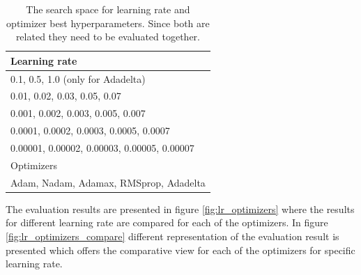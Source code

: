 \begin{table}[ht]
 \centering
 \caption{The search space for learning rate and optimizer best hyperparameters. Since both are related they need to be evaluated together.}
 \begin{tabular}{|l|} 
 \hline\hline
 \rowcolor{lightgrey}
 Learning rate \\[0.5ex] 
 \hline
 0.1, 0.5, 1.0 (only for Adadelta)\\
 0.01, 0.02, 0.03, 0.05, 0.07\\
 0.001, 0.002, 0.003, 0.005, 0.007\\
 0.0001, 0.0002, 0.0003, 0.0005, 0.0007\\
 0.00001, 0.00002, 0.00003, 0.00005, 0.00007\\
 \rowcolor{lightgrey}
 \hline
 Optimizers\\
 \hline
 Adam, Nadam, Adamax, RMSprop, Adadelta \\
 \hline \hline
\end{tabular}
\label{table:search_space_optimizers}
\end{table}

The evaluation results are presented in figure \ref{fig:lr_optimizers} where the results for different learning rate are compared for each of the optimizers. In figure \ref{fig:lr_optimizers_compare} different representation of the evaluation
result is presented which offers the comparative view for each of the optimizers for specific learning rate.

